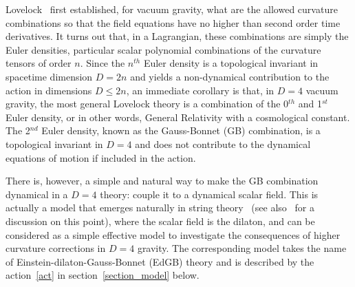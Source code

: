 \documentclass[12pt]{article}
\begin{document}
\bigskip

Lovelock~\cite{Lovelock:1971yv} first established, for vacuum gravity, what are the allowed curvature combinations so that the field equations have no higher than second order time derivatives. It turns out that, in a Lagrangian, these combinations are simply the Euler densities, particular scalar polynomial combinations of the curvature tensors of order $n$. Since the $n^{th}$ Euler density is a topological invariant in spacetime dimension $D=2n$ and yields a non-dynamical contribution to the action in dimensions $D\leqslant 2n$, an immediate corollary is that, in $D=4$ vacuum gravity, the most general Lovelock theory is a combination of the 0$^{th}$ and 1$^{st}$ Euler density, or in other words, General Relativity with a cosmological constant. The 2$^{nd}$ Euler density, known as the Gauss-Bonnet (GB) combination, is a topological invariant in $D=4$ and does not contribute to the dynamical equations of motion if included in the action. 

\bigskip

There is, however, a simple and natural way to make the GB combination dynamical in a $D=4$ theory:  couple it to a dynamical scalar field. This is actually a model that emerges naturally in string theory~\cite{Zwiebach:1985uq} (see also~\cite{Kanti:1995vq} for a discussion on this point), where the scalar field is the dilaton, and can be considered as a simple effective model to investigate the consequences of higher curvature corrections in $D=4$ gravity. The corresponding model takes the name of Einstein-dilaton-Gauss-Bonnet (EdGB) theory and is described by the action~\eqref{act} in section~\ref{section_model} below.

\bigskip
\end{document}
